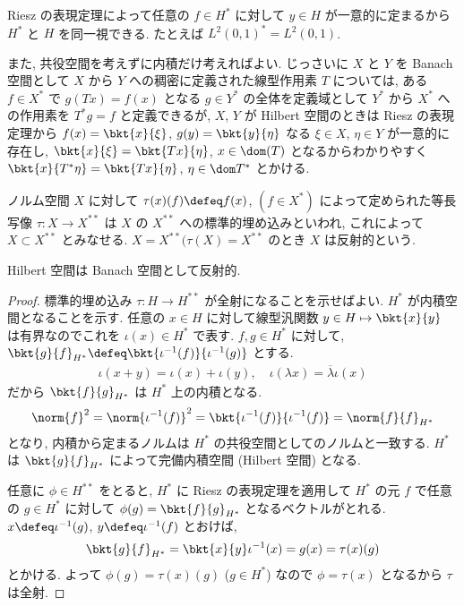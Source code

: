\documentclass[openany, a4paper, oneside]{jsbook}
\begin{document}
Riesz の表現定理によって任意の $f \in H^*$ に対して $y \in H$ が一意的に定まるから
$H^*$ と $H$ を同一視できる.
たとえば $L^2 (0, 1)^* = L^2 (0, 1)$.

また, 共役空間を考えずに内積だけ考えればよい.
じっさいに $X$ と $Y$ を Banach 空間として $X$ から $Y$ への稠密に定義された線型作用素 $T$ については,
ある $f \in X^*$ で $g (Tx) = f (x)$ となる $g \in Y^*$ の全体を定義域として
$Y^*$ から $X^*$ への作用素を $T^*g = f$ と定義できるが,
$X$, $Y$ が Hilbert 空間のときは Riesz の表現定理から
$f (x) = \bkt{x}{\xi}$, $g (y) = \bkt{y}{\eta}$ なる $\xi \in X$,
$\eta \in Y$ が一意的に存在し,
$\bkt{x}{\xi} = \bkt{Tx}{\eta}$,
$x \in \dom (T)$ となるからわかりやすく
$\bkt{x}{T^* \eta} = \bkt{Tx}{\eta}$, $\eta \in \dom T^*$ とかける.

\begin{defn}
ノルム空間 $X$ に対して $\tau (x) (f) \defeq f (x)$, $(f\in X^*)$ によって定められた等長写像
$\tau \colon X \to X^{**}$ は $X$ の $X^{**}$ への標準的埋め込みといわれ,
これによって $X \subset X^{**}$ とみなせる.
$X = X^{**} (\tau (X) = X^{**}$ のとき $X$ は反射的という.
\end{defn}
\begin{thm}
 Hilbert 空間は Banach 空間として反射的.
\end{thm}
\begin{proof}
標準的埋め込み $\tau \colon H \to H^{**}$ が全射になることを示せばよい.
$H^*$ が内積空間となることを示す.
任意の $x \in H$ に対して線型汎関数 $y \in H \mapsto \bkt{x}{y}$ は有界なのでこれを
$\iota (x) \in H^*$ で表す.
$f, g \in H^*$ に対して, $\bkt{g}{f}_{H^*} \defeq \bkt{\iota^{-1}(f)}{\iota^{-1}(g)}$ とする.
\begin{align}
 \iota (x + y)
 =
 \iota (x) + \iota (y), \quad
 \iota (\lambda x)
 =
 \overline{\lambda} \iota (x)
\end{align}
だから $\bkt{f}{g}_{H^*}$ は $H^*$ 上の内積となる.
\begin{align}
 \norm{f}^2
 =
 \norm{\iota^{-1}(f)}^2
 =
 \bkt{\iota^{-1}(f)}{\iota^{-1}(f)}
 =
 \norm{f}{f}_{H^*}
\end{align}
となり, 内積から定まるノルムは $H^*$ の共役空間としてのノルムと一致する.
$H^*$ は $\bkt{g}{f}_{H^*}$ によって完備内積空間 (Hilbert 空間) となる.

任意に $\phi \in H^{**}$ をとると, $H^*$ に Riesz の表現定理を適用して
$H^*$ の元 $f$ で任意の $g \in H^*$ に対して $\phi (g) = \bkt{f}{g}_{H^*}$ となるベクトルがとれる.
$x \defeq \iota^{-1}(g)$, $y \defeq \iota^{-1}(f)$ とおけば,
\begin{align}
 \bkt{g}{f}_{H^*}
 =
 \bkt{x}{y} \iota^{-1}(x)
 =
 g(x)
 =
 \tau (x) (g)
\end{align}
とかける.
よって $\phi (g) = \tau (x) (g)$ ($g \in H^*$) なので $\phi = \tau (x)$ となるから $\tau$ は全射.
\end{proof}
\end{document}
